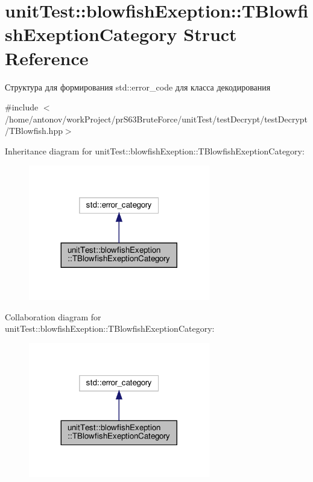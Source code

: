 \hypertarget{structunit_test_1_1blowfish_exeption_1_1_t_blowfish_exeption_category}{}\section{unit\+Test\+:\+:blowfish\+Exeption\+:\+:T\+Blowfish\+Exeption\+Category Struct Reference}
\label{structunit_test_1_1blowfish_exeption_1_1_t_blowfish_exeption_category}


Структура для формирования std\+::error\+\_\+code для класса декодирования  




{\ttfamily \#include $<$/home/antonov/work\+Project/pr\+S63\+Brute\+Force/unit\+Test/test\+Decrypt/test\+Decrypt/\+T\+Blowfish.\+hpp$>$}



Inheritance diagram for unit\+Test\+:\+:blowfish\+Exeption\+:\+:T\+Blowfish\+Exeption\+Category\+:\nopagebreak
\begin{figure}[H]
\begin{center}
\leavevmode
\includegraphics[width=224pt]{structunit_test_1_1blowfish_exeption_1_1_t_blowfish_exeption_category__inherit__graph}
\end{center}
\end{figure}


Collaboration diagram for unit\+Test\+:\+:blowfish\+Exeption\+:\+:T\+Blowfish\+Exeption\+Category\+:\nopagebreak
\begin{figure}[H]
\begin{center}
\leavevmode
\includegraphics[width=224pt]{structunit_test_1_1blowfish_exeption_1_1_t_blowfish_exeption_category__coll__graph}
\end{center}
\end{figure}
